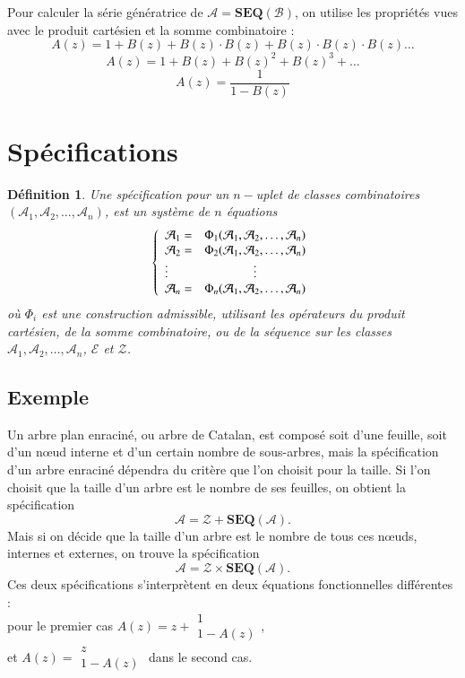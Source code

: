 \documentclass[12pt]{report}
\newtheorem*{definition}{Définition}
\newcommand{\fraction}[2]{\begin{array}{c} #1 \\ \hline #2 \end{array}}
\begin{document}
Pour calculer la série génératrice de $\mathcal A = \mathbf{SEQ}(\mathcal B)$, on utilise les propriétés vues avec le produit cartésien et la somme combinatoire : 
$$A(z) = 1+ B(z)+B(z)\cdot B(z)+B(z)\cdot B(z) \cdot B(z) \dots$$
$$A(z) = 1 + B(z)+B(z)^2+B(z)^3 + \dots $$
$$A(z)= \frac{1}{1-B(z)}$$

\section{Spécifications}
\begin{definition}
Une spécification pour un $n-$uplet de classes combinatoires $(\mathcal A_1,\mathcal A_2,\dots,\mathcal A_n)$, est un système de $n$ équations
$$\left\{
\begin{array}{l c}
  \mathcal A_1 =& \Phi_1 (\mathcal A_1,\mathcal A_2,\dots, \mathcal A_n)\\
  \mathcal A_2 = & \Phi_2 (\mathcal A_1,\mathcal A_2,\dots, \mathcal A_n)\\
  \vdots & \vdots\\
\mathcal A_n = & \Phi_n (\mathcal A_1,\mathcal A_2,\dots, \mathcal A_n)\\
\end{array}
\right.$$ 
où $\Phi_i$ est une construction admissible, utilisant les opérateurs du produit cartésien, de la somme combinatoire, ou de la séquence sur les classes $\mathcal A_1,\mathcal A_2,\dots, \mathcal A_n$, $\mathcal E$ et $\mathcal Z$.\end{definition}

\subsection*{Exemple}
Un arbre plan enraciné, ou arbre de Catalan, est composé soit d'une feuille, soit d'un nœud interne et d'un certain nombre de sous-arbres, mais la spécification d'un arbre enraciné dépendra du critère que l'on choisit pour la taille.
Si l'on choisit que la taille d'un arbre est le nombre de ses feuilles, on obtient la spécification
$$\mathcal A = \mathcal Z + \mathbf{SEQ}(\mathcal A).$$ 
Mais si on décide que la taille d'un arbre est le nombre de tous ces nœuds, internes et externes, on trouve la spécification
$$\mathcal A =\mathcal Z \times \mathbf{SEQ}(\mathcal A).$$
Ces deux spécifications s'interprètent en deux équations fonctionnelles différentes :\\
pour le premier cas $A(z)=z+\fraction{1}{1-A(z)}$,\\
et $A(z)=\fraction{z}{1-A(z)}$ dans le second cas.
\end{document}
